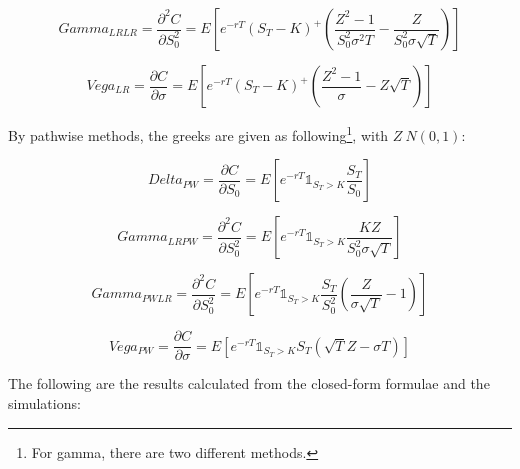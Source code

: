 \documentclass[12pt,a4paper,fleqn]{article}
\begin{document}
$$Gamma_{LR LR} = \frac{\partial^2 C}{\partial  S_0^2 }=E[e^{-rT}(S_T-K)^+(\frac{Z^2-1}{S_0^2\sigma^2 T } - \frac{Z}{S_0^2 \sigma \sqrt{T}})]$$

$$Vega_{LR} = \frac{\partial C}{\partial \sigma}=E[e^{-rT}(S_T-K)^+\left(\frac{Z^2-1}{\sigma}-Z\sqrt{T}\right)]$$

By pathwise methods, the greeks are given as following\footnote{For gamma, there are two different methods.}, with $Z~N(0,1)$:

$$Delta_{PW}=\frac{\partial C}{\partial S_0}=E[e^{-rT}\mathds{1}_{S_T>K}\frac{S_T}{S_0}]$$

$$Gamma_{LRPW} = \frac{\partial^2 C}{\partial  S_0^2 }=E[e^{-rT}\mathds{1}_{S_T>K}\frac{KZ}{S_0^2\sigma\sqrt{T}}]$$

$$Gamma_{PWLR} = \frac{\partial^2 C}{\partial  S_0^2 }=E[e^{-rT}\mathds{1}_{S_T>K}\frac{S_T}{S_0^2}\left(\frac{Z}{\sigma\sqrt{T}}-1\right)]$$

$$Vega_{PW} = \frac{\partial C}{\partial \sigma}=E[e^{-rT}\mathds{1}_{S_T>K}S_T(\sqrt{T}Z-\sigma T)]$$

The following are the results calculated from the closed-form formulae and the simulations:\\
\end{document}
